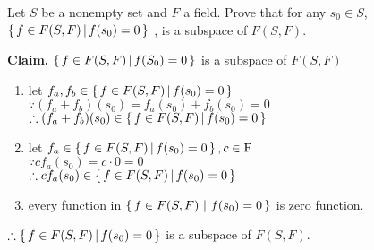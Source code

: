 Let $S$ be a nonempty set and $F$ a field. Prove that for any $s_0 \in S$,$\left\{ \,f \in F(S,F) \, | \, f(s_0) = 0 \,\right\}$ , is a subspace of $F(S,F)$.

\begin{tcolorbox}
	\begin{solution}
		\textbf{Claim.} $\left\{ \,f \in F(S,F)\,|\,f(S_0)=0 \,\right\}$ is a subspace of $F(S,F)$
		\begin{enumerate}
			\item let $f_a,f_b \in \left\{ \,f \in F(S,F)\,|\,f(s_0)=0 \,\right\}$\\
			$\because (f_a+f_b)(s_0) =f_a(s_0) + f_b(s_0) = 0$\\
			$\therefore (f_a + f_b)(s_0) \in \left\{ \,f \in F(S,F)\,|\,f(s_0)=0 \,\right\}$
			\item let $f_a \in \left\{ \,f \in F(S,F)\,|\,f(s_0)=0 \,\right\}, c \in \mathrm{F}$\\
			$\because cf_a(s_0) = c \cdot 0 = 0$\\
			$\therefore cf_a(s_0) \in \left\{ \,f \in F(S,F)\,|\,f(s_0)=0 \,\right\}$
			\item every function in $\left\{ \,f \in F(S,F)~|~f(s_0)=0 \,\right\}$ is zero function.
		\end{enumerate}
		$\therefore \left\{ \,f \in F(S,F)\,|\,f(s_0)=0 \,\right\}$ is a subspace of $F(S,F)$.
	\end{solution}
\end{tcolorbox}